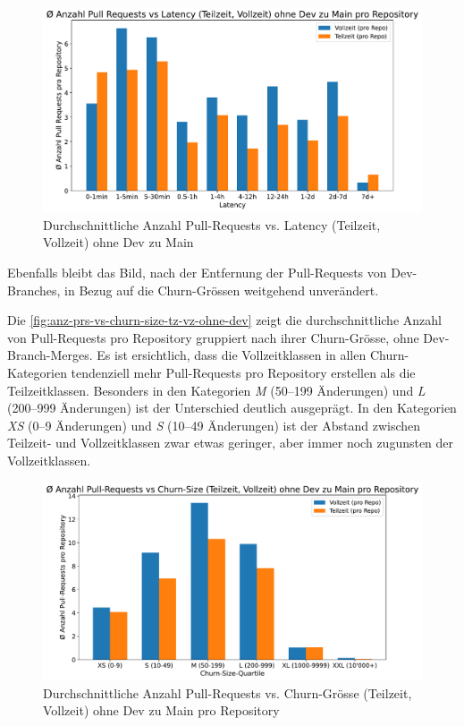 \begin{figure}[htbp]
    \includegraphics[width=\textwidth]{Figures/anz-avg-prs-vs-latency-tv-no-dev.pdf}
    \caption{Durchschnittliche Anzahl Pull-Requests vs. Latency (Teilzeit, Vollzeit) ohne Dev zu Main}
    \label{fig:anz-avg-prs-vs-latency-tv-no-dev}
\end{figure}


Ebenfalls bleibt das Bild, nach der Entfernung der Pull-Requests von Dev-Branches, in Bezug auf die Churn-Grössen weitgehend unverändert.

Die \autoref{fig:anz-prs-vs-churn-size-tz-vz-ohne-dev} zeigt die durchschnittliche Anzahl von Pull-Requests pro Repository gruppiert nach ihrer Churn-Grösse, ohne Dev-Branch-Merges. Es ist ersichtlich, dass die Vollzeitklassen in allen Churn-Kategorien tendenziell mehr Pull-Requests pro Repository erstellen als die Teilzeitklassen. Besonders in den Kategorien \textit{M} (50–199 Änderungen) und \textit{L} (200–999 Änderungen) ist der Unterschied deutlich ausgeprägt. In den Kategorien \textit{XS} (0–9 Änderungen) und \textit{S} (10–49 Änderungen) ist der Abstand zwischen Teilzeit- und Vollzeitklassen zwar etwas geringer, aber immer noch zugunsten der Vollzeitklassen.

\begin{figure}[htbp]
    \includegraphics[width=\textwidth]{Figures/avg-anz-prs-vs-churn-size-tz-vz-pro-repo-ohne-dev.pdf}
    \caption{Durchschnittliche Anzahl Pull-Requests vs. Churn-Grösse (Teilzeit, Vollzeit) ohne Dev zu Main pro Repository}
    \label{fig:anz-prs-vs-churn-size-tz-vz-ohne-dev}
\end{figure}

